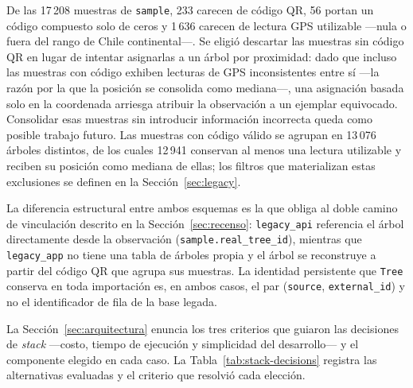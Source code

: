 De las 17\,208 muestras de \texttt{sample}, 233 carecen de código QR, 56 portan un código compuesto
solo de ceros y 1\,636 carecen de lectura GPS utilizable ---nula o fuera del rango de Chile
continental---. Se eligió descartar las muestras sin código QR en lugar de intentar asignarlas a un
árbol por proximidad: dado que incluso las muestras con código exhiben lecturas de GPS
inconsistentes entre sí ---la razón por la que la posición se consolida como mediana---, una
asignación basada solo en la coordenada arriesga atribuir la observación a un ejemplar equivocado.
Consolidar esas muestras sin introducir información incorrecta queda como posible trabajo futuro.
Las muestras con código válido se agrupan en 13\,076 árboles distintos, de los cuales 12\,941
conservan al menos una lectura utilizable y reciben su posición como mediana de ellas; los filtros
que materializan estas exclusiones se definen en la Sección~\ref{sec:legacy}.

La diferencia estructural entre ambos esquemas es la que obliga al doble camino de vinculación
descrito en la Sección~\ref{sec:recenso}: \texttt{legacy\_api} referencia el árbol directamente desde
la observación (\texttt{sample.real\_tree\_id}), mientras que \texttt{legacy\_app} no tiene una tabla
de árboles propia y el árbol se reconstruye a partir del código QR que agrupa sus muestras. La
identidad persistente que \texttt{Tree} conserva en toda importación es, en ambos casos, el par
(\texttt{source}, \texttt{external\_id}) y no el identificador de fila de la base legada.

\label{anx:stack}

La Sección~\ref{sec:arquitectura} enuncia los tres criterios que guiaron las decisiones de
\textit{stack} ---costo, tiempo de ejecución y simplicidad del desarrollo--- y el componente
elegido en cada caso. La Tabla~\ref{tab:stack-decisions} registra las alternativas evaluadas y el
criterio que resolvió cada elección.

